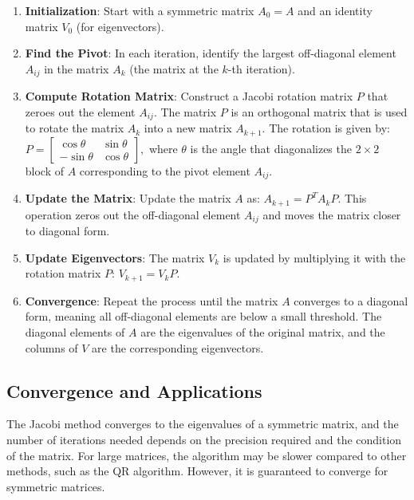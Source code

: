 \documentclass[journal]{IEEEtran}
\begin{document}
\begin{enumerate}
    \item \textbf{Initialization}: Start with a symmetric matrix $A_0 = A$ and an identity matrix $V_0$ (for eigenvectors).
    
    \item \textbf{Find the Pivot}: In each iteration, identify the largest off-diagonal element $A_{ij}$ in the matrix $A_k$ (the matrix at the $k$-th iteration).
    
    \item \textbf{Compute Rotation Matrix}: Construct a Jacobi rotation matrix $P$ that zeroes out the element $A_{ij}$. The matrix $P$ is an orthogonal matrix that is used to rotate the matrix $A_k$ into a new matrix $A_{k+1}$. The rotation is given by:
    $
    P = \begin{bmatrix} 
    \cos\theta & \sin\theta \\
    -\sin\theta & \cos\theta
    \end{bmatrix},
    $
    where $\theta$ is the angle that diagonalizes the $2 \times 2$ block of $A$ corresponding to the pivot element $A_{ij}$.
    
    \item \textbf{Update the Matrix}: Update the matrix $A$ as:
    $
    A_{k+1} = P^T A_k P.
    $
    This operation zeros out the off-diagonal element $A_{ij}$ and moves the matrix closer to diagonal form.
    
    \item \textbf{Update Eigenvectors}: The matrix $V_k$ is updated by multiplying it with the rotation matrix $P$:
    $
    V_{k+1} = V_k P.
    $
    
    \item \textbf{Convergence}: Repeat the process until the matrix $A$ converges to a diagonal form, meaning all off-diagonal elements are below a small threshold. The diagonal elements of $A$ are the eigenvalues of the original matrix, and the columns of $V$ are the corresponding eigenvectors.
\end{enumerate}

\subsection{Convergence and Applications}
The Jacobi method converges to the eigenvalues of a symmetric matrix, and the number of iterations needed depends on the precision required and the condition of the matrix. For large matrices, the algorithm may be slower compared to other methods, such as the QR algorithm. However, it is guaranteed to converge for symmetric matrices.
\end{document}
